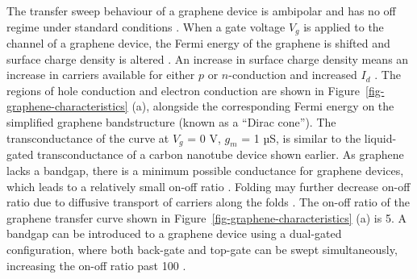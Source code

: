 \documentclass[
  a4paper,
]{scrbook}
\begin{document}
The transfer sweep behaviour of a graphene device is ambipolar and has
no off regime under standard conditions
\autocite{Novoselov2004,Bartolomeo2011,Ohno2015}. When a gate voltage
\(V_g\) is applied to the channel of a graphene device, the Fermi energy
of the graphene is shifted and surface charge density is altered
\autocite{Novoselov2004,Heller2010,Ohno2015}. An increase in surface
charge density means an increase in carriers available for either \(p\)
or \(n\)-conduction and increased \(I_d\) \autocite{Geim2007}. The
regions of hole conduction and electron conduction are shown in
Figure~\ref{fig-graphene-characteristics} (a), alongside the
corresponding Fermi energy on the simplified graphene bandstructure
(known as a ``Dirac cone''). The transconductance of the curve at
\(V_g\) = 0 V, \(g_m\) = 1 µS, is similar to the liquid-gated
transconductance of a carbon nanotube device shown earlier. As graphene
lacks a bandgap, there is a minimum possible conductance for graphene
devices, which leads to a relatively small on-off ratio
\autocite{Novoselov2004,Geim2007}. Folding may further decrease on-off
ratio due to diffusive transport of carriers along the folds
\autocite{Zhu2012}. The on-off ratio of the graphene transfer curve
shown in Figure~\ref{fig-graphene-characteristics} (a) is 5. A bandgap
can be introduced to a graphene device using a dual-gated configuration,
where both back-gate and top-gate can be swept simultaneously,
increasing the on-off ratio past 100
\autocite{Xia2010,Ahn2020,Shkodra2021}.
\end{document}
